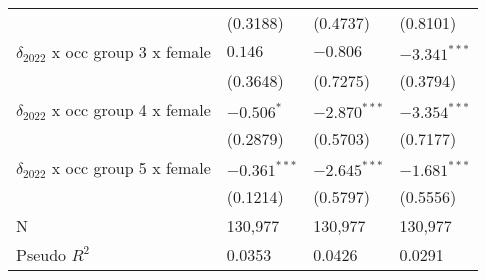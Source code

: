 \begin{tabular}{llll}
                                       &           (0.3188) &           (0.4737) &           (0.8101) \\
$\delta_{2022}$ x occ group 3 x female &            $0.146$ &           $-0.806$ &     $-3.341^{***}$ \\
                                       &           (0.3648) &           (0.7275) &           (0.3794) \\
$\delta_{2022}$ x occ group 4 x female &         $-0.506^*$ &     $-2.870^{***}$ &     $-3.354^{***}$ \\
                                       &           (0.2879) &           (0.5703) &           (0.7177) \\
$\delta_{2022}$ x occ group 5 x female &     $-0.361^{***}$ &     $-2.645^{***}$ &     $-1.681^{***}$ \\
                                       &           (0.1214) &           (0.5797) &           (0.5556) \\
\midrule
N                                      &            130,977 &            130,977 &            130,977 \\
Pseudo $R^2$                           &             0.0353 &             0.0426 &             0.0291 \\
\bottomrule
\end{tabular}

